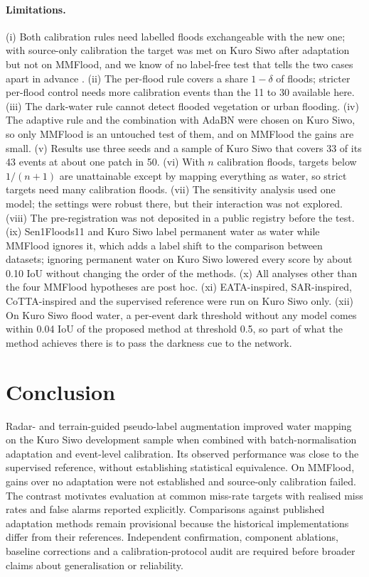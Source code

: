 \documentclass[a4paper,fleqn]{cas-sc}
\begin{document}
\paragraph{Limitations.} (i) Both calibration rules need labelled floods exchangeable with the new one; with source-only calibration the target was met on Kuro Siwo after adaptation but not on MMFlood, and we know of no label-free test that tells the two cases apart in advance \citep{tibshirani2019covshift,barber2023beyond}. (ii) The per-flood rule covers a share $1-\delta$ of floods; stricter per-flood control \citep{bates2021rcps} needs more calibration events than the 11 to 30 available here. (iii) The dark-water rule cannot detect flooded vegetation or urban flooding. (iv) The adaptive rule and the combination with AdaBN were chosen on Kuro Siwo, so only MMFlood is an untouched test of them, and on MMFlood the gains are small. (v) Results use three seeds and a sample of Kuro Siwo that covers 33 of its 43 events at about one patch in 50. (vi) With $n$ calibration floods, targets below $1/(n+1)$ are unattainable except by mapping everything as water, so strict targets need many calibration floods. (vii) The sensitivity analysis used one model; the settings were robust there, but their interaction was not explored. (viii) The pre-registration was not deposited in a public registry before the test. (ix) Sen1Floods11 and Kuro Siwo label permanent water as water while MMFlood ignores it, which adds a label shift to the comparison between datasets; ignoring permanent water on Kuro Siwo lowered every score by about 0.10 IoU without changing the order of the methods. (x) All analyses other than the four MMFlood hypotheses are post hoc. (xi) EATA-inspired, SAR-inspired, CoTTA-inspired and the supervised reference were run on Kuro Siwo only. (xii) On Kuro Siwo flood water, a per-event dark threshold without any model comes within 0.04 IoU of the proposed method at threshold 0.5, so part of what the method achieves there is to pass the darkness cue to the network.

\section{Conclusion}
\label{sec:conclusion}
Radar- and terrain-guided pseudo-label augmentation improved water mapping on the Kuro Siwo development sample when combined with batch-normalisation adaptation and event-level calibration. Its observed performance was close to the supervised reference, without establishing statistical equivalence. On MMFlood, gains over no adaptation were not established and source-only calibration failed. The contrast motivates evaluation at common miss-rate targets with realised miss rates and false alarms reported explicitly. Comparisons against published adaptation methods remain provisional because the historical implementations differ from their references. Independent confirmation, component ablations, baseline corrections and a calibration-protocol audit are required before broader claims about generalisation or reliability.
\end{document}
